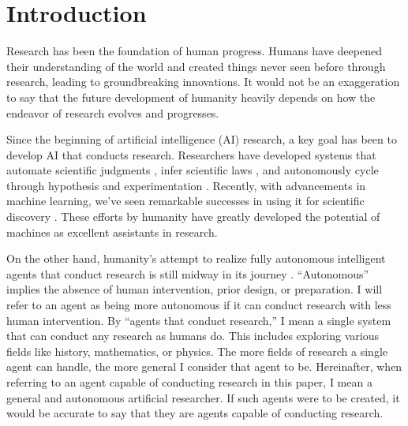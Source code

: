 \section{Introduction}
Research has been the foundation of human progress. Humans have deepened their understanding of the world and created things never seen before through research, leading to groundbreaking innovations. It would not be an exaggeration to say that the future development of humanity heavily depends on how the endeavor of research evolves and progresses.

Since the beginning of artificial intelligence (AI) research, a key goal has been to develop AI that conducts research. Researchers have developed systems that automate scientific judgments \cite{lindsay1993dendral}, infer scientific laws \cite{langley1987scientific}, and autonomously cycle through hypothesis and experimentation \cite{king2004functional}. Recently, with advancements in machine learning, we've seen remarkable successes in using it for scientific discovery \cite{wang2023scientific,xu2021artificial,zhang2023artificial,ai4science2023impact}. These efforts by humanity have greatly developed the potential of machines as excellent assistants in research.

On the other hand, humanity's attempt to realize fully autonomous intelligent agents that conduct research is still midway in its journey \cite{zenil2023,coley2020autonomousII}. ``Autonomous'' implies the absence of human intervention, prior design, or preparation. I will refer to an agent as being more autonomous if it can conduct research with less human intervention. By ``agents that conduct research,'' I mean a single system that can conduct any research as humans do. This includes exploring various fields like history, mathematics, or physics. The more fields of research a single agent can handle, the more general I consider that agent to be. Hereinafter, when referring to an agent capable of conducting research in this paper, I mean a general and autonomous artificial researcher. If such agents were to be created, it would be accurate to say that they are agents capable of conducting research.


